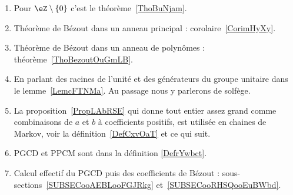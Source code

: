 
 \label{THEMEooNRZHooYuuHyt}
 \begin{enumerate}
    \item
        Pour \( \eZ\setminus\{ 0 \}\)\) c'est le théorème~\ref{ThoBuNjam}.
    \item
        Théorème de Bézout dans un anneau principal : corolaire~\ref{CorimHyXy}.
    \item
        Théorème de Bézout dans un anneau de polynômes : théorème~\ref{ThoBezoutOuGmLB}.
    \item
        En parlant des racines de l'unité et des générateurs du groupe unitaire dans le lemme~\ref{LemcFTNMa}. Au passage nous y parlerons de solfège.
    \item
        La proposition~\ref{PropLAbRSE} qui donne tout entier assez grand comme combinaisons de \( a \) et \( b\) à coefficients positifs, est utilisée en chaines de Markov, voir la définition~\ref{DefCxvOaT} et ce qui suit.
    \item
        PGCD et PPCM sont dans la définition \ref{DefrYwbct}.
    \item
        Calcul effectif du PGCD puis des coefficients de Bézout : sous-sections~\ref{SUBSECooAEBLooFGJRkg} et~\ref{SUBSECooRHSQooEuBWbd}.
\end{enumerate}

